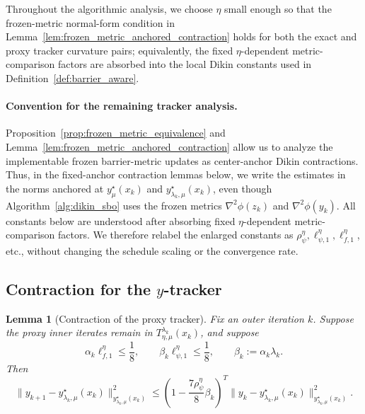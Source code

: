\documentclass{article}
\newtheorem{lemma}{Lemma}
\begin{document}
Throughout the algorithmic analysis, we choose \(\eta\) small enough so that the frozen-metric
normal-form condition in Lemma~\ref{lem:frozen_metric_anchored_contraction} holds for both the
exact and proxy tracker curvature pairs; equivalently, the fixed \(\eta\)-dependent metric-comparison
factors are absorbed into the local Dikin constants used in Definition~\ref{def:barrier_aware}.


\paragraph{Convention for the remaining tracker analysis.}
Proposition~\ref{prop:frozen_metric_equivalence} and
Lemma~\ref{lem:frozen_metric_anchored_contraction} allow us to analyze the implementable frozen
barrier-metric updates as center-anchor Dikin contractions. Thus, in the fixed-anchor contraction
lemmas below, we write the estimates in the norms anchored at
\(y_\mu^\star(x_k)\) and \(y_{\lambda_k,\mu}^\star(x_k)\), even though Algorithm~\ref{alg:dikin_sbo}
uses the frozen metrics \(\nabla^2\phi(z_k)\) and \(\nabla^2\phi(y_k)\). All constants below are
understood after absorbing fixed \(\eta\)-dependent metric-comparison factors. We therefore relabel
the enlarged constants as
\(\rho_\psi^\eta,\ell_{\psi,1}^\eta,\ell_{f,1}^\eta\), etc., without changing the schedule scaling or the
convergence rate.

\subsection{Contraction for the \(y\)-tracker}
\label{app:y_fixed_anchor}


\begin{lemma}[Contraction of the proxy tracker]
\label{lem:y_fixed_anchor_contraction}
Fix an outer iteration \(k\). Suppose the proxy inner iterates remain in
\(T_{\eta,\mu}^{\lambda_k}(x_k)\), and suppose
\begin{equation}\label{eq:step_proxy_contraction}
\alpha_k\ell_{f,1}^{\eta}\le \frac18,
\qquad
\beta_k\ell_{\psi,1}^{\eta}\le \frac18,
\qquad
\beta_k:=\alpha_k\lambda_k .
\end{equation}
Then
\begin{equation}\label{eq:ytracker_contraction}
\|y_{k+1}-y_{\lambda_k,\mu}^\star(x_k)\|_{y_{\lambda_k,\mu}^\star(x_k)}^2
\le
\left(1-\frac{7\rho_\psi^\eta}{8}\beta_k\right)^T
\|y_k-y_{\lambda_k,\mu}^\star(x_k)\|_{y_{\lambda_k,\mu}^\star(x_k)}^2 .
\end{equation}
\end{lemma}
\end{document}

